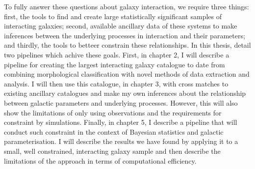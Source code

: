 To fully answer these questions about galaxy interaction, we require three things: first, the tools to find and create large statistically significant samples of interacting galaxies; second, available ancillary data of these systems to make inferences between the underlying processes in interaction and their parameters; and thirdly, the tools to betteer constrain these relationships. In this thesis, detail two pipelines which achive these goals. First, in chapter 2, I will describe a pipeline for creating the largest interacting galaxy catalogue to date from combining morphological classification with novel methods of data extraction and analysis. I will then use this catalogue, in chapter 3, with cross matches to existing ancillary catalogues and make my own inferences about the relationship between galactic parameters and underlying processes. However, this will also show the limitations of only using observations and the requirements for constraint by simulations. Finally, in chapter 5,  I describe a pipeline that will conduct such constraint in the context of Bayesian statistics and galactic parameterisation. I will describe the results we have found by applying it to a small, well constrained, interacting galaxy sample and then describe the limitations of the approach in terms of computational efficiency.